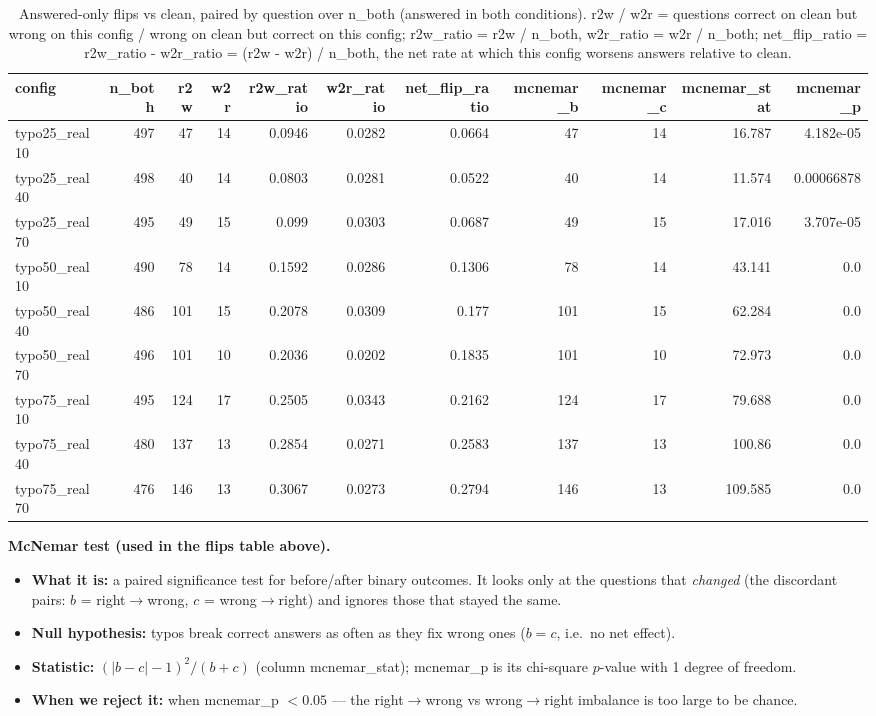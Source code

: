 \documentclass[11pt]{article}
\begin{document}
\begin{table}[H]
\centering
\caption{Answered-only flips vs clean, paired by question over n\_both (answered in both conditions). r2w / w2r = questions correct on clean but wrong on this config / wrong on clean but correct on this config; r2w\_ratio = r2w / n\_both, w2r\_ratio = w2r / n\_both; net\_flip\_ratio = r2w\_ratio - w2r\_ratio = (r2w - w2r) / n\_both, the net rate at which this config worsens answers relative to clean.}
\small
\begin{adjustbox}{max width=\textwidth}
\begin{tabular}{lrrrrrrrrrr}
\toprule
\textbf{config} & \textbf{n\_both} & \textbf{r2w} & \textbf{w2r} & \textbf{r2w\_ratio} & \textbf{w2r\_ratio} & \textbf{net\_flip\_ratio} & \textbf{mcnemar\_b} & \textbf{mcnemar\_c} & \textbf{mcnemar\_stat} & \textbf{mcnemar\_p} \\
\midrule
typo25\_real10 & 497 & 47 & 14 & 0.0946 & 0.0282 & 0.0664 & 47 & 14 & 16.787 & 4.182e-05 \\
typo25\_real40 & 498 & 40 & 14 & 0.0803 & 0.0281 & 0.0522 & 40 & 14 & 11.574 & 0.00066878 \\
typo25\_real70 & 495 & 49 & 15 & 0.099 & 0.0303 & 0.0687 & 49 & 15 & 17.016 & 3.707e-05 \\
typo50\_real10 & 490 & 78 & 14 & 0.1592 & 0.0286 & 0.1306 & 78 & 14 & 43.141 & 0.0 \\
typo50\_real40 & 486 & 101 & 15 & 0.2078 & 0.0309 & 0.177 & 101 & 15 & 62.284 & 0.0 \\
typo50\_real70 & 496 & 101 & 10 & 0.2036 & 0.0202 & 0.1835 & 101 & 10 & 72.973 & 0.0 \\
typo75\_real10 & 495 & 124 & 17 & 0.2505 & 0.0343 & 0.2162 & 124 & 17 & 79.688 & 0.0 \\
typo75\_real40 & 480 & 137 & 13 & 0.2854 & 0.0271 & 0.2583 & 137 & 13 & 100.86 & 0.0 \\
typo75\_real70 & 476 & 146 & 13 & 0.3067 & 0.0273 & 0.2794 & 146 & 13 & 109.585 & 0.0 \\
\bottomrule
\end{tabular}
\end{adjustbox}
\end{table}

\medskip
\noindent\textbf{McNemar test (used in the flips table above).}
\begin{itemize}\setlength{\itemsep}{1pt}
  \item \textbf{What it is:} a paired significance test for before/after binary
  outcomes. It looks only at the questions that \emph{changed} (the discordant pairs:
  $b$ = right$\to$wrong, $c$ = wrong$\to$right) and ignores those that stayed the same.
  \item \textbf{Null hypothesis:} typos break correct answers as often as they fix
  wrong ones ($b = c$, i.e.\ no net effect).
  \item \textbf{Statistic:} $(|b - c| - 1)^2 / (b + c)$ (column mcnemar\_stat);
  mcnemar\_p is its chi-square $p$-value with 1 degree of freedom.
  \item \textbf{When we reject it:} when mcnemar\_p $< 0.05$ --- the
  right$\to$wrong vs wrong$\to$right imbalance is too large to be chance.
\end{itemize}
\end{document}
